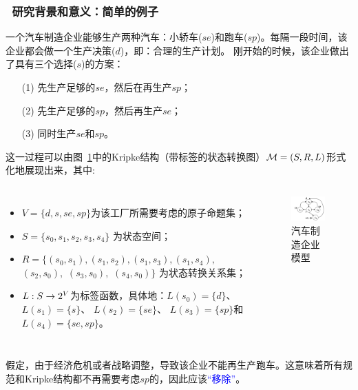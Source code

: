 \documentclass[9pt, CJK]{beamer}
\begin{document}
\begin{frame}
	\frametitle{~研究背景和意义：{\small 简单的例子}}
	{\scriptsize \begin{example}[汽车制造企业模型]\label{car_manufacturing}
		
			一个汽车制造企业能够生产两种汽车：小轿车($se$)和跑车($sp$)。每隔一段时间，该企业都会做一个生产决策($d$)，即：合理的生产计划。
			刚开始的时候，该企业做出了具有三个选择($s$)的方案：
			\begin{itemize}
				\item[(1)] 先生产足够的$se$，然后在再生产$sp$；
				\item[(2)] 先生产足够的$sp$，然后再生产$se$；
				\item[(3)] 同时生产$se$和$sp$。
			\end{itemize}
		这一过程可以由图~\ref{BVM}中的Kripke结构（带标签的状态转换图）${\cal M}=(S,R,L)$形式化地展现出来，其中:
		\begin{columns}
			\begin{itemize}
				\item $V=\{d,s, se, sp\}$为该工厂所需要考虑的原子命题集；
				\item $S=\{s_0,s_1,s_2,s_3,s_4\}$ 为状态空间；
				\item $R = \{(s_0, s_1), (s_1,s_2), (s_1,s_3), (s_1,s_4),
				$ $(s_2,s_0),$ $(s_3,s_0),$ $(s_4,s_0)\}$ 为状态转换关系集；
				\item $L: S \rightarrow 2^V$为标签函数，具体地：$L(s_0) = \{d\}$、$L(s_1) = \{s\}$、 $L(s_2)=\{se\}$、 $L(s_3) = \{sp\}$和$L(s_4) = \{se,sp\}$。
			\end{itemize}
			 \begin{figure}
			 	\includegraphics[width=3cm]{figures/NnewCar}
			 	\caption{汽车制造企业模型}\label{BVM}
			 \end{figure}
		\end{columns}
		假定，由于经济危机或者战略调整，导致该企业不能再生产跑车。这意味着所有规范和Kripke结构都不再需要考虑$sp$的，因此应该\textcolor{blue}{“移除”}。
	\end{example}}
\end{frame}
	
\end{document}
